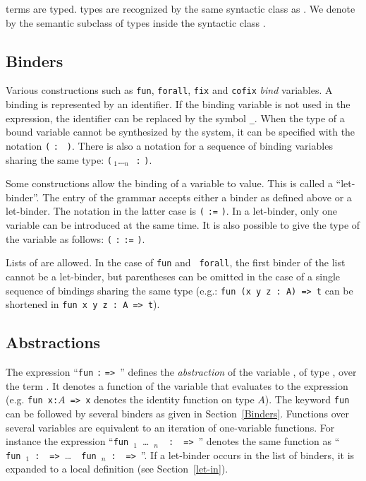 \bigskip

{\Coq} terms are typed. {\Coq} types are recognized by the same
syntactic class as {\term}. We denote by {\type} the semantic subclass
of types inside the syntactic class {\term}.

\subsection{Binders
\label{Binders}
}

Various constructions such as {\tt fun}, {\tt forall}, {\tt fix} and
{\tt cofix} {\em bind} variables. A binding is represented by an
identifier. If the binding variable is not used in the expression, the
identifier can be replaced by the symbol {\tt \_}.  When the type of a
bound variable cannot be synthesized by the system, it can be
specified with the notation {\tt (}\,{\ident}\,{\tt :}\,{\type}\,{\tt
)}. There is also a notation for a sequence of binding variables
sharing the same type: {\tt (}\,{\ident$_1$}\ldots{\ident$_n$}\,{\tt
:}\,{\type}\,{\tt )}.

Some constructions allow the binding of a variable to value. This is
called a ``let-binder''. The entry {\binderlet} of the grammar accepts
either a binder as defined above or a let-binder. The notation in the
latter case is {\tt (}\,{\ident}\,{\tt :=}\,{\term}\,{\tt )}. In a
let-binder, only one variable can be introduced at the same
time. It is also possible to give the type of the variable as follows:
{\tt (}\,{\ident}\,{\tt :}\,{\term}\,{\tt :=}\,{\term}\,{\tt )}.

Lists of {\binderlet} are allowed. In the case of {\tt fun} and {\tt
forall}, the first binder of the list cannot be a let-binder, but
parentheses can be omitted in the case of a single sequence of
bindings sharing the same type (e.g.: {\tt fun~(x~y~z~:~A)~=>~t} can
be shortened in {\tt fun~x~y~z~:~A~=>~t}).

\subsection{Abstractions
\label{abstractions}
}

The expression ``{\tt fun} {\ident} {\tt :} {\type} {\tt =>}~{\term}''
defines the {\em abstraction} of the variable {\ident}, of type
{\type}, over the term {\term}. It denotes a function of the variable
{\ident} that evaluates to the expression {\term} (e.g. {\tt fun x:$A$
=> x} denotes the identity function on type $A$).
The keyword {\tt fun} can be followed by several binders as given in
Section~\ref{Binders}. Functions over several variables are
equivalent to an iteration of one-variable functions.  For instance the
expression ``{\tt fun}~{\ident$_{1}$}~{\ldots}~{\ident$_{n}$}~{\tt
:}~\type~{\tt =>}~{\term}'' denotes the same function as ``{\tt
fun}~{\ident$_{1}$}~{\tt :}~\type~{\tt =>}~{\ldots}~{\tt
fun}~{\ident$_{n}$}~{\tt :}~\type~{\tt =>}~{\term}''. If a let-binder
occurs in the list of binders, it is expanded to a local definition
(see Section~\ref{let-in}).

